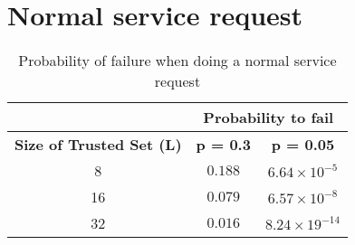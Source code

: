 \section{Normal service request}
\label{sec:eval_service_request}
  \begin{table}
    \centering
    \footnotesize
    \begin{tabular}{|c|c|c|}
      \cline{2-3}
      \multicolumn{1}{c|}{}&  \multicolumn{2}{c|}{\textbf{Probability to fail}} \\ \cline{2-3}
      \hline
      \textbf{Size of Trusted Set (L)} & \textbf{p = 0.3} & \textbf{p = 0.05} \\
      \hline \hline
      8 &  $0.188$ & $6.64 \times 10^{-5}$ \\
      \hline
      16 & $0.079$ & $6.57 \times 10^{-8}$  \\
      \hline
      32 & $0.016$ & $8.24 \times 19^{-14}$  \\
      \hline
    \end{tabular}
    \caption{Probability of failure when doing a normal service request}
    \label{tab:p_service_request}
  \end{table}
  
